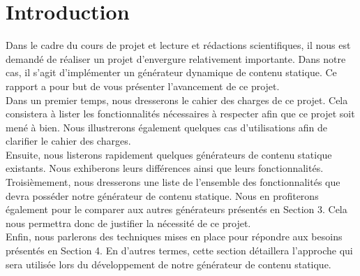 \section{Introduction}

	Dans le cadre du cours de projet et lecture et rédactions scientifiques, il nous est demandé de réaliser un projet d'envergure relativement importante. Dans notre cas, il s'agit d'implémenter un générateur dynamique de contenu statique. Ce rapport a pour but de vous présenter l'avancement de ce projet.\\
	
	Dans un premier temps, nous dresserons le cahier des charges de ce projet. Cela consistera à lister les fonctionnalités nécessaires à respecter afin que ce projet soit mené à bien. Nous illustrerons également quelques cas d'utilisations afin de clarifier le cahier des charges.\\
	
	Ensuite, nous listerons rapidement quelques générateurs de contenu statique existants. Nous exhiberons leurs différences ainsi que leurs fonctionnalités.\\
	
	Troisièmement, nous dresserons une liste de l'ensemble des fonctionnalités que devra posséder notre générateur de contenu statique. Nous en profiterons également pour le comparer aux autres générateurs présentés en Section 3. Cela nous permettra donc de justifier la nécessité de ce projet.\\
	
	Enfin, nous parlerons des techniques mises en place pour répondre aux besoins présentés en Section 4. En d'autres termes, cette section détaillera l'approche qui sera utilisée lors du développement de notre générateur de contenu statique.

	